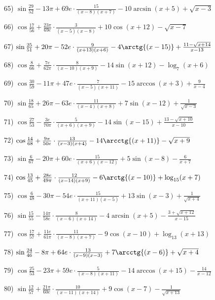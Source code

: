 \documentclass[11pt,ukrainian]{article}
\begin{document}
65) \space 
{ ${\sin\frac{29}{52}} - 13{\pi} + 69 e\cdot {\frac{15}{(x - 8)(x + 7)}} - {10\arcsin{(x + 5)}} + {\sqrt{x - 3}}$}
\smallskip\par
66) \space 
{ ${\cos\frac{17}{56}} + \frac{23{\pi}}{69 e}\cdot {\frac{3}{(x - 5)(x - 8)}} + {10\cos{(x + 12)}} - {\sqrt{x - 7}}$}
\smallskip\par
67) \space 
{ ${\sin\frac{25}{51}} + 20{\pi} - 52 e\cdot {\frac{9}{(x + 13)(x + 6)}} - {4\arctg{(x - 15)}} + {\frac{11 - \sqrt{x + 14}}{x - 13}}$}
\smallskip\par
68) \space 
{ ${\cos\frac{8}{66}} + \frac{7 e}{62{\pi}}\cdot {\frac{8}{(x - 10)(x + 9)}} - {14\sin{(x + 12)}} - {\log_{7}(x + 6)}$}
\smallskip\par
69) \space 
{ ${\cos\frac{30}{59}} - 11{\pi} + 47 e\cdot {\frac{7}{(x - 5)(x + 11)}} - {15\arccos{(x + 3)}} + { \frac{9}{x - 4}}$}
\smallskip\par
70) \space 
{ ${\sin\frac{18}{65}} + 26{\pi} - 63 e\cdot {\frac{11}{(x - 4)(x + 8)}} + {7\sin{(x - 12)}} + {\frac{1}{\sqrt{x - 3}}}$}
\smallskip\par
71) \space 
{ ${\cos\frac{27}{53}} - \frac{3 e}{70{\pi}}\cdot {\frac{5}{(x + 6)(x + 9)}} - {14\sin{(x - 15)}} + {\frac{13 - \sqrt{x + 10}}{x - 10}}$}
\smallskip\par
72) \space 
{ ${\cos\frac{14}{68}} + \frac{9{\pi}}{50 e}\cdot {\frac{13}{(x - 3)(x + 4)}} - {14\arcctg{(x + 11)}} - {\sqrt{x + 9}}$}
\smallskip\par
73) \space 
{ ${\sin\frac{6}{67}} - 20{\pi} + 60 e\cdot {\frac{15}{(x + 6)(x - 12)}} + {5\sin{(x - 8)}} - { \frac{6}{x + 7}}$}
\smallskip\par
74) \space 
{ ${\cos\frac{13}{45}} + \frac{28 e}{49{\pi}}\cdot {\frac{12}{(x - 14)(x + 9)}} - {6\arctg{(x - 10)}} + {\log_{15}(x + 7)}$}
\smallskip\par
75) \space 
{ ${\cos\frac{6}{48}} - 30{\pi} - 54 e\cdot {\frac{15}{(x + 11)(x - 5)}} + {13\sin{(x - 3)}} + {\frac{1}{\sqrt{x + 4}}}$}
\smallskip\par
76) \space 
{ ${\sin\frac{15}{55}} - \frac{14{\pi}}{58 e}\cdot {\frac{8}{(x - 6)(x + 14)}} - {4\arcsin{(x + 5)}} - {\frac{3 + \sqrt{x + 12}}{x - 15}}$}
\smallskip\par
77) \space 
{ ${\cos\frac{17}{57}} + \frac{11 e}{61{\pi}}\cdot {\frac{11}{(x - 8)(x + 7)}} - {9\cos{(x - 10)}} + {\log_{13}(x + 13)}$}
\smallskip\par
78) \space 
{ ${\sin\frac{24}{46}} - 8{\pi} + 64 e\cdot {\frac{13}{(x - 9)(x - 3)}} + {7\arcctg{(x - 6)}} + {\sqrt{x + 4}}$}
\smallskip\par
79) \space 
{ ${\cos\frac{25}{53}} - 23{\pi} + 59 e\cdot {\frac{5}{(x - 8)(x + 11)}} - {14\arccos{(x + 15)}} - { \frac{14}{x - 12}}$}
\smallskip\par
80) \space 
{ ${\sin\frac{12}{57}} + \frac{21{\pi}}{60 e}\cdot {\frac{10}{(x - 11)(x + 14)}} + {9\cos{(x - 7)}} - {\frac{1}{\sqrt{x + 13}}}$}
\smallskip\par
\end{document}
